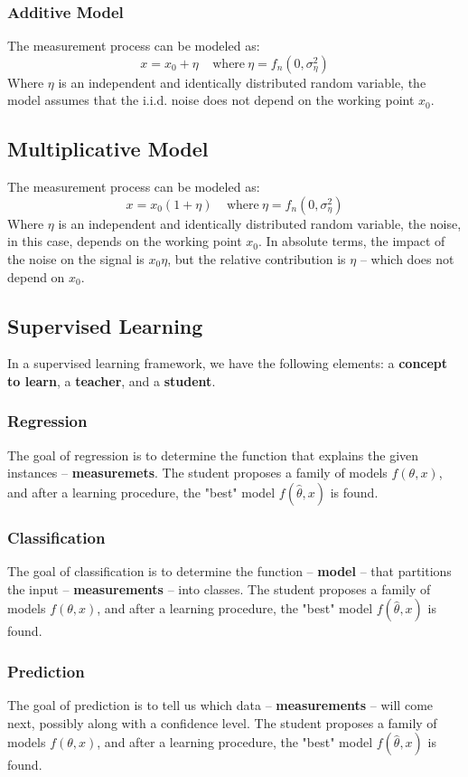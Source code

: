 \documentclass{article}
\begin{document}
\subsubsection{Additive Model}
The measurement process can be modeled as:
\[ x = x_0 + \eta ~~~~~\text{where}~\eta = f_n(0, \sigma^2_\eta) \]
Where $\eta$ is an independent and identically distributed random variable, the model assumes that the i.i.d. noise does not depend on the working point $x_0$.

\subsection{Multiplicative Model}
The measurement process can be modeled as:
\[ x = x_0 (1 + \eta) ~~~~~\text{where}~\eta = f_n(0, \sigma^2_\eta) \]
Where $\eta$ is an independent and identically distributed random variable, the noise, in this case, depends on the working point $x_0$. In absolute terms, the impact of the noise on the signal is $x_0 \eta$, but the relative contribution is $\eta$ -- which does not depend on $x_0$.

\subsection{Supervised Learning}
In a supervised learning framework, we have the following elements: a \textbf{concept to learn}, a \textbf{teacher}, and a \textbf{student}.

\subsubsection{Regression}
The goal of regression is to determine the function that explains the given instances -- \textbf{measuremets}. The student proposes a family of models $f(\theta, x)$, and after a learning procedure, the "best" model $f(\hat \theta, x)$ is found.

\subsubsection{Classification}
The goal of classification is to determine the function -- \textbf{model} -- that partitions the input -- \textbf{measurements} -- into classes. The student proposes a family of models $f(\theta, x)$, and after a learning procedure, the "best" model $f(\hat \theta, x)$ is found.

\subsubsection{Prediction}
The goal of prediction is to tell us which data -- \textbf{measurements} -- will come next, possibly along with a confidence level. The student proposes a family of models $f(\theta, x)$, and after a learning procedure, the "best" model $f(\hat \theta, x)$ is found.
\end{document}
